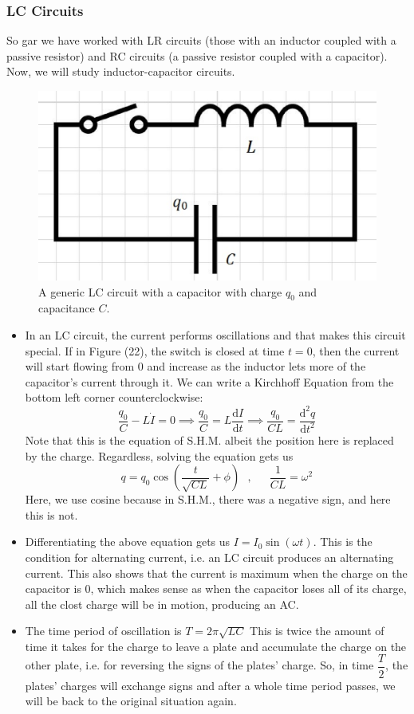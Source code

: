 \documentclass{scrartcl}
\begin{document}
    \subsubsection{LC Circuits}\newline
    So gar we have worked with LR circuits (those with an inductor coupled with a passive resistor) and RC circuits (a passive resistor coupled with a capacitor). Now, we will study inductor-capacitor circuits.
    \begin{figure}[H]
        \centering
        \includegraphics[scale=.35]{LC.eps}
        \caption{A generic LC circuit with a capacitor with charge $q_0$ and capacitance $C$.}
    \end{figure}
    \begin{itemize}
        \item In an LC circuit, the current performs oscillations and that makes this circuit special. If in Figure (22), the switch is closed at time $t=0$, then the current will start flowing from 0 and increase as the inductor lets more of the capacitor's current through it. We can write a Kirchhoff Equation from the bottom left corner counterclockwise: \[\frac{q_0}C-L\dot I=0\implies\frac{q_0}C=L\frac{\mathrm dI}{\mathrm dt}\implies\frac{q_0}{CL}=\frac{\mathrm d^2q}{\mathrm dt^2}\] Note that this is the equation of S.H.M. albeit the position here is replaced by the charge. Regardless, solving the equation gets us \[\boxed{q=q_0\cos\left(\frac t{\sqrt{CL}}+\phi\right)}\text{ }\text{, }\text{ }\text{ }\frac1{CL}=\omega^2\] Here, we use cosine because in S.H.M., there was a negative sign, and here this is not.
        \item Differentiating the above equation gets us $I=I_0\sin\left(\omega t\right)$. This is the condition for alternating current, i.e. an LC circuit produces an alternating current. This also shows that the current is maximum when the charge on the capacitor is 0, which makes sense as when the capacitor loses all of its charge, all the clost charge will be in motion, producing an AC.
        \item The time period of oscillation is $\boxed{T=2\pi\sqrt{LC}}$ This is twice the amount of time it takes for the charge to leave a plate and accumulate the charge on the other plate, i.e. for reversing the signs of the plates' charge. So, in time $\dfrac T2$, the plates' charges will exchange signs and after a whole time period passes, we will be back to the original situation again.
    \end{itemize}
\end{document}
